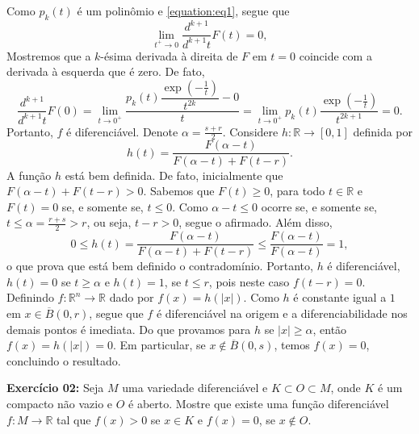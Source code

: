 \documentclass[twoside,openright,titlepage,numbers=noenddot,headinclude,  lineheaders footinclude=true,cleardoublepage=empty,BCOR=5mm,paper=a4,fontsize=12pt ]{scrbook}
\begin{document}
Como $p _k (t)$ é um polinômio e \eqref{equation:eq1}, segue que
\[
    \lim _{t^+ \to 0} \frac{d^{k+1}}{d^{k+1} t} F (t) = 0,
\]
Mostremos que a $k$-ésima derivada à direita de $F$ em $t = 0$ coincide com a derivada à esquerda que é zero. 
De fato,
\[
    \frac{d^{k+1}}{d^{k+1} t} F (0) 
    = \lim_{t \rightarrow 0^+}  \dfrac{p _k (t) \dfrac{\exp\left(  -\frac{1}{t} \right)}{t^{2k} } - 0}{t} 
    =  \lim_{t \rightarrow 0^+}  p _{k} (t) \dfrac{\exp\left(  -\frac{1}{t} \right)}{t^{2k+1}}  = 0.
\]
Portanto, $f$ é diferenciável. 
Denote $\alpha  = \frac{s+r}{2}$. 
Considere $h: \mathbb{R} \rightarrow [0,1]$ definida por
\[
    h(t) =  \dfrac{F(\alpha -t)}{F(\alpha - t ) + F(t-r)}.
\]
A função $h$ está bem definida. 
De fato, inicialmente que $F(\alpha  -   t ) + F(t - r) >0$. Sabemos que $F(t)\geq 0$, para todo $t \in \mathbb{R}$ e $F(t)  = 0 $ se, e somente se, $t \leq 0$. 
Como $\alpha  - t \leq 0$ ocorre se, e somente se, $ t\leq  \alpha  = \frac{r+s}{2} > r$, ou seja, $ t-r > 0$, segue o afirmado. Além disso,
\[
    0 \leq h(t)   = \dfrac{F(\alpha -t)}{F(\alpha - t ) + F(t-r)} \leq  \dfrac{F(\alpha -t)}{F(\alpha - t ) } 
    = 1,
\]
o que prova que está bem definido o contradomínio. 
Portanto, $h$ é diferenciável, $h(t) = 0$ se $t \geq \alpha $ e $h (t) = 1$, se $t \leq r $, pois neste caso $ f(t-r) = 0$. 
Definindo $f: \mathbb{R}^n\rightarrow \mathbb{R}$ dado por $f(x) = h(|x|)$. 
Como $h$ é constante igual a $1$ em $x \in \overline{B}(0, r) $, segue que $f$ é diferenciável na origem e a diferenciabilidade nos demais pontos é imediata. 
Do que provamos para $h$ se $|x|\geq \alpha$, então $f(x) = h(|x|) = 0$. 
Em particular, se $x \notin \overline{B} (0, s)$, temos $f(x) =0$, concluindo o resultado. 



\vspace{2cm}

\textbf{Exercício 02:} 
Seja $M$ uma variedade diferenciável e $ K \subset O\subset M$, onde $K$ é um compacto não vazio e $O$ é aberto. 
Mostre que existe uma função diferenciável $f:M \rightarrow \mathbb{R}$ tal que $ f(x)>0$ se $x \in K$ e $f(x) = 0$, se $ x \notin O$.

\vspace{0.5cm}
\end{document}
